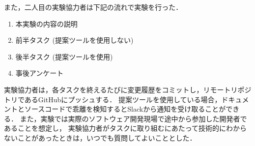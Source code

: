 また，二人目の実験協力者は下記の流れで実験を行った．
\begin{enumerate}
    \item 本実験の内容の説明
    \item 前半タスク (提案ツールを使用しない)
    \item 後半タスク (提案ツールを使用)
    \item 事後アンケート
\end{enumerate}

実験協力者は，各タスクを終えるたびに変更履歴をコミットし，リモートリポジトリであるGitHubにプッシュする．
提案ツールを使用している場合，ドキュメントとソースコードで乖離を検知するとSlackから通知を受け取ることができる．
また，実験では実際のソフトウェア開発現場で途中から参加した開発者であることを想定し，
実験協力者がタスクに取り組むにあたって技術的にわからないことがあったときは，いつでも質問してよいこととした．
